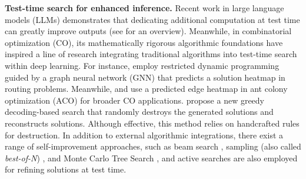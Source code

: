 \textbf{Test-time search for enhanced inference. } Recent work in large language models (LLMs) \citep{bai2022constitutional,madaan2023self-refine,snell2024scaling,brown2024large} demonstrates that dedicating additional computation at test time can greatly improve outputs (see \citet{dong2024survey} for an overview).
Meanwhile, in combinatorial optimization (CO), its mathematically rigorous algorithmic foundations have inspired a line of research integrating traditional algorithms into test-time search within deep learning. For instance, \citep{kool2022deep} employ restricted dynamic programming guided by a graph neural network (GNN) that predicts a solution heatmap in routing problems. Meanwhile, \citet{ye2023deepaco} and \citet{kim2024ant} use a predicted edge heatmap in ant colony optimization (ACO) for broader CO applications. \citet{luo2023lehd} propose a new greedy decoding-based search that randomly destroys the generated solutions and reconstructs solutions. Although effective, this method relies on handcrafted rules for destruction.
In addition to external algorithmic integrations, there exist a range of self-improvement approaches, such as beam search \citep{joshi2021learning,choo2022simulation}, sampling (also called \textit{best-of-N}) \citep{kool2018attention}, and Monte Carlo Tree Search \citep{qiu2022dimes}, and active searches \citep{bello2016neural,hottung2021efficient,son2023meta} are also employed for refining solutions at test time.

